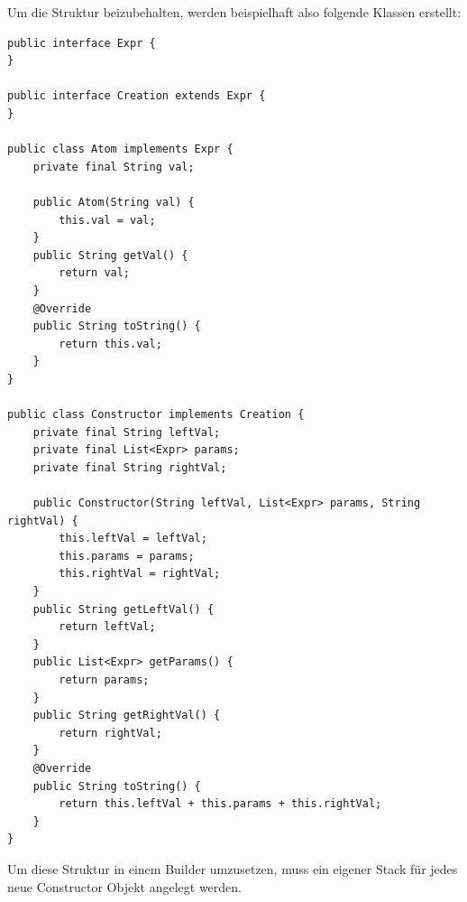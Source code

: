\newpage
Um die Struktur beizubehalten, werden beispielhaft also folgende Klassen erstellt:
\begin{lstlisting}[label={lst:Aufgabe2b_Classes}]
public interface Expr {
}

public interface Creation extends Expr {
}

public class Atom implements Expr {
    private final String val;

    public Atom(String val) {
        this.val = val;
    }
    public String getVal() {
        return val;
    }
    @Override
    public String toString() {
        return this.val;
    }
}

public class Constructor implements Creation {
    private final String leftVal;
    private final List<Expr> params;
    private final String rightVal;

    public Constructor(String leftVal, List<Expr> params, String rightVal) {
        this.leftVal = leftVal;
        this.params = params;
        this.rightVal = rightVal;
    }
    public String getLeftVal() {
        return leftVal;
    }
    public List<Expr> getParams() {
        return params;
    }
    public String getRightVal() {
        return rightVal;
    }
    @Override
    public String toString() {
        return this.leftVal + this.params + this.rightVal;
    }
}
\end{lstlisting}

Um diese Struktur in einem Builder umzusetzen, muss ein eigener Stack für
jedes neue Constructor Objekt angelegt werden.

